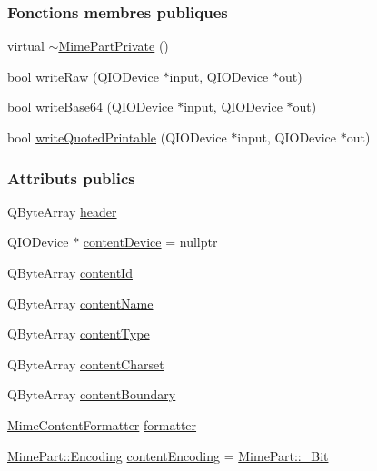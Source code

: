 \subsubsection*{Fonctions membres publiques}
\begin{DoxyCompactItemize}
\item 
virtual \hyperlink{class_simple_mail_1_1_mime_part_private_ad2003c3ac13e03f8abc76392cbba9e1d}{$\sim$\+Mime\+Part\+Private} ()
\item 
bool \hyperlink{class_simple_mail_1_1_mime_part_private_a5409a7f49d4e02b3587ee7b679e62c35}{write\+Raw} (Q\+I\+O\+Device $\ast$input, Q\+I\+O\+Device $\ast$out)
\item 
bool \hyperlink{class_simple_mail_1_1_mime_part_private_ab3c8a3c921311eabdb608c6396d535a6}{write\+Base64} (Q\+I\+O\+Device $\ast$input, Q\+I\+O\+Device $\ast$out)
\item 
bool \hyperlink{class_simple_mail_1_1_mime_part_private_a075937d19cf60c10f765154aa30fa4b6}{write\+Quoted\+Printable} (Q\+I\+O\+Device $\ast$input, Q\+I\+O\+Device $\ast$out)
\end{DoxyCompactItemize}
\subsubsection*{Attributs publics}
\begin{DoxyCompactItemize}
\item 
Q\+Byte\+Array \hyperlink{class_simple_mail_1_1_mime_part_private_a5308879f21bcc7dbb90c2138156f1aa6}{header}
\item 
Q\+I\+O\+Device $\ast$ \hyperlink{class_simple_mail_1_1_mime_part_private_a713cdb28a4dff7bdca3148b7815f4fb0}{content\+Device} = nullptr
\item 
Q\+Byte\+Array \hyperlink{class_simple_mail_1_1_mime_part_private_a812caf7bf9cb864c79ece5bd8b5fd9aa}{content\+Id}
\item 
Q\+Byte\+Array \hyperlink{class_simple_mail_1_1_mime_part_private_ae1ca103dbbf1b688c05f1ab40b6606f6}{content\+Name}
\item 
Q\+Byte\+Array \hyperlink{class_simple_mail_1_1_mime_part_private_afa20c6a7b4de31598affbc3e8fae207a}{content\+Type}
\item 
Q\+Byte\+Array \hyperlink{class_simple_mail_1_1_mime_part_private_a93c4dba106b4ce82df90cff3e5967cc3}{content\+Charset}
\item 
Q\+Byte\+Array \hyperlink{class_simple_mail_1_1_mime_part_private_a28343d468126cf7373115bedc7a1edf7}{content\+Boundary}
\item 
\hyperlink{class_simple_mail_1_1_mime_content_formatter}{Mime\+Content\+Formatter} \hyperlink{class_simple_mail_1_1_mime_part_private_a0a630f148c8e8070c73b60c75e9777a4}{formatter}
\item 
\hyperlink{class_simple_mail_1_1_mime_part_ae67a2f5406958b95b18bf31a7bbeb5c9}{Mime\+Part\+::\+Encoding} \hyperlink{class_simple_mail_1_1_mime_part_private_a3c7e92b71828d0ffead39309000a5092}{content\+Encoding} = \hyperlink{class_simple_mail_1_1_mime_part_ae67a2f5406958b95b18bf31a7bbeb5c9a93d518d86036ce6f149ffa646b52235a}{Mime\+Part\+::\+\_\+Bit}
\end{DoxyCompactItemize}


